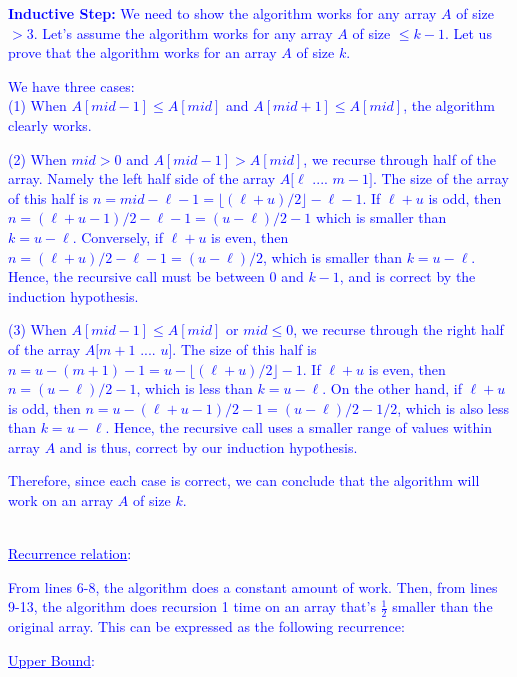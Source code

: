\documentclass[11pt]{article}
\renewcommand{\blacksquare}{\textcolor{blue}{\openbox}}
\begin{document}
\begin{enumerate}
\textcolor{blue}{{\bf Inductive Step:} We need to show the algorithm works for any array $A$ of size $> 3$. Let's assume the algorithm works for any array $A$ of size $\leq k-1$. Let us prove that the algorithm works for an array $A$ of size $k$.}

\textcolor{blue}{
We have three cases:\\
(1) When $A[mid-1] \leq A[mid]$ and $A[mid+1] \leq A[mid]$, the algorithm clearly works.}

\textcolor{blue}{
(2) When $mid > 0$ and $A[mid-1] > A[mid]$, we recurse through half of the array. Namely the left half side of the array $A[\ell$ .... $m-1]$. The size of the array of this half is $n = mid - \ell - 1 = \lfloor (\ell + u)/2 \rfloor - \ell - 1$. If $\ell + u$ is odd, then $n = (\ell + u - 1)/2 - \ell - 1 = (u - \ell)/2 -1$ which is smaller than $k=u -\ell$. Conversely, if $\ell + u$ is even, then $n=(\ell + u)/2 - \ell -1 = (u-\ell)/2$, which is smaller than $k=u-\ell$. Hence, the recursive call must be between $0$ and $k-1$, and is correct by the induction hypothesis.}

\textcolor{blue}{
(3) When $A[mid-1] \leq A[mid]$ or $mid \leq 0$, we recurse through the right half of the array $A[m+1$ .... $u]$. The size of this half is $n=u-(m+1)-1=u-\lfloor (\ell + u)/2 \rfloor - 1$. If $\ell + u$ is even, then $n=(u-\ell)/2-1$, which is less than $k=u-\ell$. On the other hand, if $\ell + u$ is odd, then $n=u-(\ell + u - 1)/2 -1=(u-\ell)/2 - 1/2$, which is also less than $k=u-\ell$. Hence, the recursive call uses a smaller range of values within array $A$ and is thus, correct by our induction hypothesis.}

\textcolor{blue}{Therefore, since each case is correct, we can conclude that the algorithm will work on an array $A$ of size $k$.}
\-\hspace{14.16cm}\blacksquare\\ 
\- \

\textcolor{blue}{ \underline{Recurrence relation}:}

\textcolor{blue}{ From lines 6-8, the algorithm does a constant amount of work. Then, from lines 9-13, the algorithm does recursion 1 time on an array that's $\frac{1}{2}$ smaller than the original array. This can be expressed as the following recurrence:}
\textcolor{blue}{\begin{center}\end{center}}

\textcolor{blue}{ \underline{Upper Bound}:}


\end{enumerate}
\end{document}
